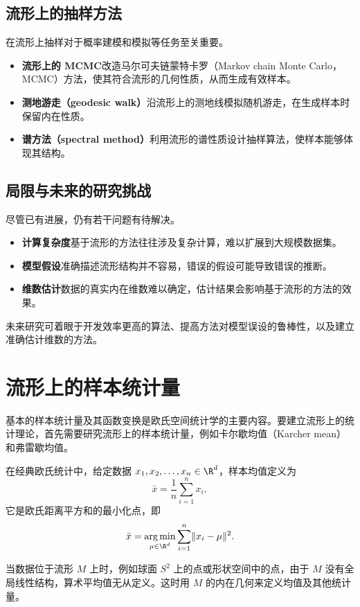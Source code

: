 \subsection{流形上的抽样方法}

在流形上抽样对于概率建模和模拟等任务至关重要。
\begin{itemize}
  \item \textbf{流形上的 MCMC}改造马尔可夫链蒙特卡罗（Markov chain Monte Carlo，MCMC）方法，使其符合流形的几何性质，从而生成有效样本。
  \item \textbf{测地游走（geodesic walk）}沿流形上的测地线模拟随机游走，在生成样本时保留内在性质。
  \item \textbf{谱方法（spectral method）}利用流形的谱性质设计抽样算法，使样本能够体现其结构。
\end{itemize}

\subsection{局限与未来的研究挑战}

尽管已有进展，仍有若干问题有待解决。
\begin{itemize}
  \item \textbf{计算复杂度}基于流形的方法往往涉及复杂计算，难以扩展到大规模数据集。
  \item \textbf{模型假设}准确描述流形结构并不容易，错误的假设可能导致错误的推断。
  \item \textbf{维数估计}数据的真实内在维数难以确定，估计结果会影响基于流形的方法的效果。
\end{itemize}
未来研究可着眼于开发效率更高的算法、提高方法对模型误设的鲁棒性，以及建立准确估计维数的方法。

\section{流形上的样本统计量}

基本的样本统计量及其函数变换是欧氏空间统计学的主要内容。要建立流形上的统计理论，首先需要研究流形上的样本统计量，例如卡尔歇均值（Karcher mean）和弗雷歇均值。

在经典欧氏统计中，给定数据 $x_1,x_2,\ldots,x_n\in\R^d$，样本均值定义为
\[
  \bar x=\frac{1}{n}\sum_{i=1}^{n}x_i,
\]
它是欧氏距离平方和的最小化点，即
\[
  \bar x=\operatorname*{arg\,min}_{\mu\in\R^d}
           \sum_{i=1}^{n}\lVert x_i-\mu\rVert^2.
\]

当数据位于流形 $M$ 上时，例如球面 $S^2$ 上的点或形状空间中的点，由于 $M$ 没有全局线性结构，算术平均值无从定义。这时用 $M$ 的内在几何来定义均值及其他统计量。


